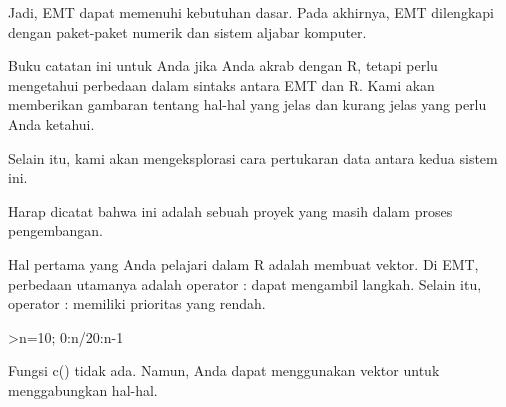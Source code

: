 \documentclass[12pt,arial,letterpaper]{book}
\begin{document}
\begin{eulercomment}
\begin{eulercomment}
\begin{eulercomment}
\begin{eulercomment}
\begin{eulercomment}
\begin{eulercomment}
\begin{eulercomment}
\begin{eulercomment}
\begin{eulercomment}
\begin{eulercomment}
\begin{eulercomment}
\begin{eulercomment}
\begin{eulercomment}
\begin{eulercomment}
\begin{eulercomment}
\begin{eulercomment}
\begin{eulercomment}
\begin{eulercomment}
\begin{eulercomment}
\begin{eulercomment}
\begin{eulercomment}
\begin{eulercomment}
\begin{eulercomment}
\begin{eulercomment}
\begin{eulercomment}
\begin{eulercomment}
\begin{eulercomment}
\begin{eulercomment}
\begin{eulercomment}
\begin{eulercomment}
\begin{eulercomment}
\begin{eulercomment}
\begin{eulercomment}
\begin{eulercomment}
\begin{eulercomment}
\begin{eulercomment}
\begin{eulercomment}
Jadi, EMT dapat memenuhi kebutuhan dasar. Pada akhirnya, EMT
dilengkapi dengan paket-paket numerik dan sistem aljabar komputer.

Buku catatan ini untuk Anda jika Anda akrab dengan R, tetapi perlu
mengetahui perbedaan dalam sintaks antara EMT dan R. Kami akan
memberikan gambaran tentang hal-hal yang jelas dan kurang jelas yang
perlu Anda ketahui.

Selain itu, kami akan mengeksplorasi cara pertukaran data antara kedua
sistem ini.
\end{eulercomment}
\begin{eulercomment}
Harap dicatat bahwa ini adalah sebuah proyek yang masih dalam proses
pengembangan.
\end{eulercomment}
\begin{eulercomment}
Hal pertama yang Anda pelajari dalam R adalah membuat vektor. Di EMT,
perbedaan utamanya adalah operator : dapat mengambil langkah. Selain
itu, operator : memiliki prioritas yang rendah.
\end{eulercomment}
\begin{eulerprompt}
>n=10; 0:n/20:n-1
\end{eulerprompt}
\begin{euleroutput}
  [0,  0.5,  1,  1.5,  2,  2.5,  3,  3.5,  4,  4.5,  5,  5.5,  6,  6.5,
  7,  7.5,  8,  8.5,  9]
\end{euleroutput}
\begin{eulercomment}
Fungsi c() tidak ada. Namun, Anda dapat menggunakan vektor untuk
menggabungkan hal-hal.


\end{eulercomment}
\end{eulercomment}
\end{eulercomment}
\end{eulercomment}
\end{eulercomment}
\end{eulercomment}
\end{eulercomment}
\end{eulercomment}
\end{eulercomment}
\end{eulercomment}
\end{eulercomment}
\end{eulercomment}
\end{eulercomment}
\end{eulercomment}
\end{eulercomment}
\end{eulercomment}
\end{eulercomment}
\end{eulercomment}
\end{eulercomment}
\end{eulercomment}
\end{eulercomment}
\end{eulercomment}
\end{eulercomment}
\end{eulercomment}
\end{eulercomment}
\end{eulercomment}
\end{eulercomment}
\end{eulercomment}
\end{eulercomment}
\end{eulercomment}
\end{eulercomment}
\end{eulercomment}
\end{eulercomment}
\end{eulercomment}
\end{eulercomment}
\end{eulercomment}
\end{eulercomment}
\end{document}
